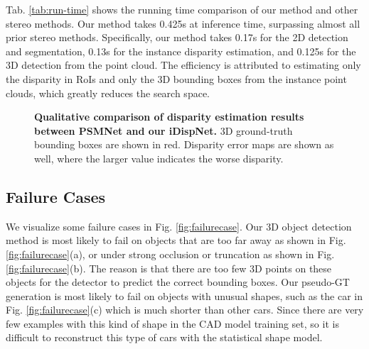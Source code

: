 \documentclass[10pt,twocolumn,letterpaper]{article}
\begin{document}
 Tab. \ref{tab:run-time} shows the running time comparison of our method and other stereo methods.
Our method takes 0.425s at inference time, surpassing almost all prior stereo methods.
Specifically, our method takes 0.17s for the 2D detection and segmentation, 0.13s for the instance disparity estimation, and 0.125s for the 3D detection from the point cloud.
The efficiency is attributed to estimating only the disparity in RoIs and only the 3D bounding boxes from the instance point clouds, which greatly reduces the search space.



\begin{figure}
{\centering
{}
}
\vspace{0.5em}
\caption{\textbf{Qualitative comparison of disparity estimation results between PSMNet and our iDispNet.} 3D ground-truth bounding boxes are shown in red. Disparity error maps are shown as well, where the larger value indicates the worse disparity.}
\label{fig:disp_quality}
\end{figure}  
\subsection{Failure Cases}\label{sec:exp-failure-cases}
We visualize some failure cases in Fig. \ref{fig:failurecase}.
Our 3D object detection method is most likely to fail on objects that are too far away as shown in Fig. \ref{fig:failurecase}(a), or under strong occlusion or truncation as shown in Fig. \ref{fig:failurecase}(b). 
The reason is that there are too few 3D points on these objects for the detector to predict the correct bounding boxes.
Our pseudo-GT generation is most likely to fail on objects with unusual shapes, such as the car in Fig. \ref{fig:failurecase}(c) which is much shorter than other cars. Since there are very few examples with this kind of shape in the CAD model training set, so it is difficult to reconstruct this type of cars with the statistical shape model.
\end{document}
